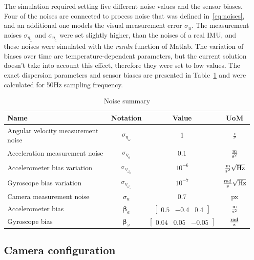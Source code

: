 The simulation required setting five different noise values and the sensor biases. Four of the noises are connected to process noise that was defined in~\eqref{eq:noises}, and an additional one models the visual measurement error $\sigma_u$. The measurement noises $\sigma_{\eta_\omega}$ and $\sigma_{\eta_a}$ were set slightly higher, than the noises of a real IMU, and these noises were simulated with the \textit{randn} function of Matlab. The variation of biases over time are temperature-dependent parameters, but the current solution doesn't take into account this effect, therefore they were set to low values. The exact dispersion parameters and sensor biases are presented in Table~\ref{tab:noises} and were calculated for 50\si{\hertz} sampling frequency.

\begin{table}[!ht]
    \centering
    \begin{tabular}{| l | c | c | c |}
        \hline
        Name & Notation & Value & UoM \\ 
        \hline
        Angular velocity measurement noise & $\sigma_{\eta_\omega}$ & 1 & $\si{\frac{\circ}{\second}}$ \\
        Acceleration measurement noise & $\sigma_{\eta_a}$ & 0.1 & $\si{\frac{\meter}{\second\squared}}$ \\
        Accelerometer bias variation & $\sigma_{\eta_{\beta_a}}$ & $10^{-6}$ & $\si{\frac{\meter}{\second\squared}\sqrt{\hertz}}$ \\
        Gyroscope bias variation & $\sigma_{\eta_{\beta_\omega}}$ & $10^{-7}$ & $\si{\frac{\radian}{\second}\sqrt{\hertz}}$ \\
        Camera measurement noise & $\sigma_u$ & 0.7 & \si{px} \\ 
        Accelerometer bias & $\boldsymbol{\beta}_a$ & $\begin{bmatrix}0.5 & -0.4 & 0.4 \end{bmatrix}$ & $\si{\frac{\meter}{\second\squared}}$ \\
        Gyroscope bias & $\boldsymbol{\beta}_\omega$ & $\begin{bmatrix}0.04 & 0.05 & -0.05\end{bmatrix}$ & $\si{\frac{\radian}{\second}}$ \\
        \hline
    \end{tabular}
    \caption{Noise summary}\label{tab:noises}
\end{table}

\subsection{Camera configuration}

